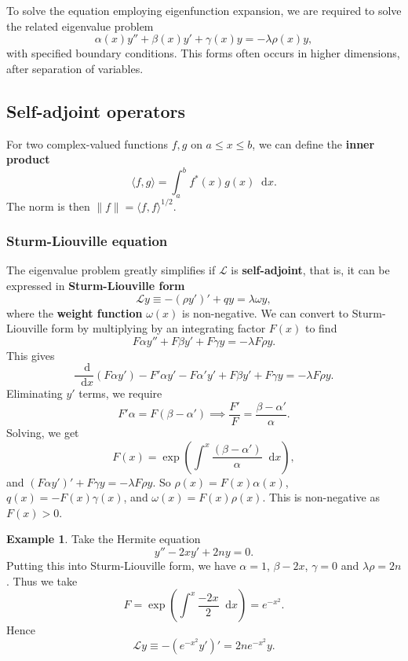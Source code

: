 \documentclass[12pt]{article}
\newcommand{\diff}{\mathop{}\!\mathrm{d}}
\theoremstyle{definition}
\newtheorem{example}{Example}[section]
\theoremstyle{remark}
\begin{document}
To solve the equation employing eigenfunction expansion, we are required to solve the related eigenvalue problem
\[
	\alpha(x) y'' + \beta(x) y' + \gamma(x) y = - \lambda \rho(x) y
,\]
with specified boundary conditions. This forms often occurs in higher dimensions, after separation of variables.

\subsection{Self-adjoint operators}%
\label{sub:self_adjoint_operators}

For two complex-valued functions $f, g$ on $a \leq x \leq b$, we can define the \textbf{inner product}
\[
	\langle f, g \rangle = \int_{a}^{b} f^{\ast}(x) g(x)\diff x
.\]
The norm is then $\|f\| = \langle f, f \rangle^{1/2}$.

\subsubsection{Sturm-Liouville equation}%
\label{subsub:sturm_liouville_equation}

The eigenvalue problem greatly simplifies if $\mathcal{L}$ is \textbf{self-adjoint}, that is, it can be expressed in \textbf{Sturm-Liouville form}
\[
	\mathcal{L} y \equiv - (\rho y')' + q y = \lambda \omega y
,\]
where the \textbf{weight function} $\omega(x)$ is non-negative. We can convert to Sturm-Liouville form by multiplying by an integrating factor $F(x)$ to find
\[
F \alpha y'' + F \beta y' + F \gamma y = - \lambda F \rho y
.\]
This gives
\[
	\frac{\diff}{\diff x} (F \alpha y') - F' \alpha y' - F \alpha' y' + F \beta y' + F \gamma y = - \lambda F \rho y
.\]
Eliminating $y'$ terms, we require
\[
	F' \alpha = F(\beta - \alpha') \implies \frac{F'}{F} = \frac{\beta - \alpha'}{\alpha}
.\]
Solving, we get
\[
	F(x) = \exp \left( \int^{x} \frac{(\beta - \alpha')}{\alpha} \diff x \right)
,\]
and $(F \alpha y')' + F \gamma y = - \lambda F \rho y$. So $\rho(x) = F(x) \alpha (x)$, $q(x) = - F(x) \gamma(x)$, and $\omega(x) = F(x) \rho(x)$. This is non-negative as $F(x) > 0$.

\begin{adjustbox}{minipage = \columnwidth - 25.5pt, margin=1em, frame=1pt, margin=0em}
\begin{example}
	Take the Hermite equation
	\[
	y'' - 2xy' + 2n y = 0
	.\]
	Putting this into Sturm-Liouville form, we have $\alpha = 1$, $\beta - 2x$, $\gamma = 0$ and $\lambda \rho = 2n$. Thus we take
	\[
		F = \exp \left( \int^{x} \frac{-2x}{2} \diff x \right) = e^{-x^2}
	.\]
	Hence
	\[
		\mathcal{L} y \equiv -(e^{-x^2} y')' = 2n e^{-x^2}y
	.\]
\end{example}

\end{adjustbox}
\end{document}

